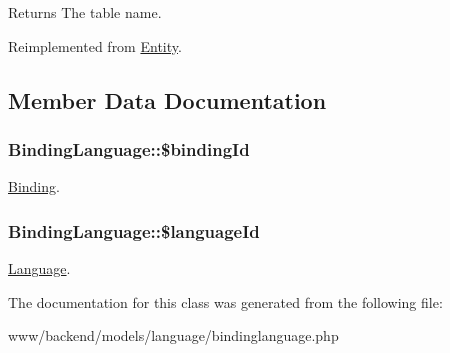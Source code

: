 \begin{DoxyReturn}{Returns}
The table name. 
\end{DoxyReturn}


Reimplemented from \hyperlink{classEntity_a8305fd94740ac62cbafb9de76567ce37}{Entity}.



\subsection{Member Data Documentation}
\hypertarget{classBindingLanguage_a4f5a54f30fd269c6db9196dd20f3e9d1}{
\subsubsection[{\$bindingId}]{\setlength{\rightskip}{0pt plus 5cm}BindingLanguage::\$bindingId}}
\label{classBindingLanguage_a4f5a54f30fd269c6db9196dd20f3e9d1}
\hyperlink{classBinding}{Binding}. \hypertarget{classBindingLanguage_a06beffccd3823c174be9117bf3ea3d50}{
\subsubsection[{\$languageId}]{\setlength{\rightskip}{0pt plus 5cm}BindingLanguage::\$languageId}}
\label{classBindingLanguage_a06beffccd3823c174be9117bf3ea3d50}
\hyperlink{classLanguage}{Language}. 

The documentation for this class was generated from the following file:\begin{DoxyCompactItemize}
\item 
www/backend/models/language/bindinglanguage.php\end{DoxyCompactItemize}
